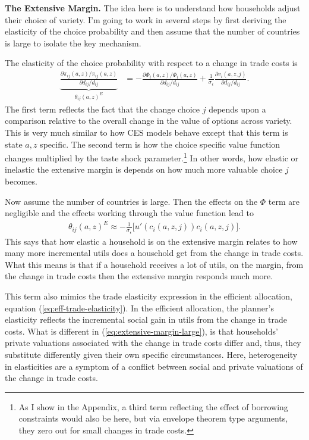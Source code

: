 \documentclass[12pt,pdftex]{article}
\begin{document}
\begin{onehalfspacing}
\textbf{The Extensive Margin.} The idea here is to understand how households adjust their choice of variety. I'm going to work in several steps by first deriving the elasticity of the choice probability and then assume that the number of countries is large to isolate the key mechanism.

The elasticity of the choice probability with respect to a change in trade costs is
\begin{align}
\underbrace{ \frac{\partial \pi_{ij}(a,z) / \pi_{ij}(a,z)}{\partial d_{ij} / d_{ij}} }_{\theta_{ij}(a,z)^{E}} &= -\frac{\partial \Phi_{i}(a,z) / \Phi_{i}(a,z)}{\partial d_{ij}/d_{ij}} + \frac{1}{\sigma_{\epsilon}}\frac{\partial v_{i}(a,z,j)}{\partial d_{ij}/d_{ij}} .
\label{eq:extensive-margin}
\end{align}
The first term reflects the fact that the change choice $j$ depends upon a comparison relative to the overall change in the value of options across variety. This is very much similar to how CES models behave except that this term is state $a,z$ specific. The second term is how the choice specific value function changes multiplied by the taste shock parameter.\footnote{As I show in the Appendix, a third term reflecting the effect of borrowing constraints would also be here, but via envelope theorem type arguments, they zero out for small changes in trade costs.} In other words, how elastic or inelastic the extensive margin is depends on how much more valuable choice $j$ becomes.

Now assume the number of countries is large. Then the effects on the $\Phi$ term are negligible and the effects working through the value function lead to
\begin{align}
\theta_{ij}(a,z)^{E} \approx -\frac{1}{\sigma_{\epsilon}}\bigg[u'(c_{i}(a,z,j))c_{i}(a,z,j)\bigg]. \label{eq:extensive-margin-large}
\end{align}
This says that how elastic a household is on the extensive margin relates to how many more incremental utils does a household get from the change in trade costs. What this means is that if a household receives a lot of utils, on the margin, from the change in trade costs then the extensive margin responds much more.

This term also mimics the trade elasticity expression in the efficient allocation, equation (\ref{eq:eff-trade-elasticity}). In the efficient allocation, the planner's elasticity reflects the incremental social gain in utils from the change in trade costs. What is different in (\ref{eq:extensive-margin-large}), is that households' private valuations associated with the change in trade costs differ and, thus, they substitute differently given their own specific circumstances. Here, heterogeneity in elasticities are a symptom of a conflict between social and private valuations of the change in trade costs.


\end{onehalfspacing}
\end{document}
